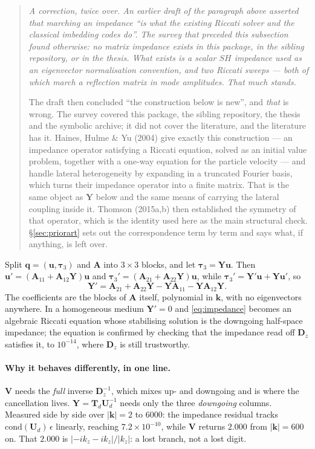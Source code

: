 \documentclass[11pt,a4paper]{article}
\newcommand{\bA}{\mathbf{A}}
\newcommand{\bV}{\mathbf{V}}
\newcommand{\bq}{\mathbf{q}}
\newcommand{\bu}{\mathbf{u}}
\newcommand{\bta}{\boldsymbol{\tau}}
\newcommand{\bY}{\mathbf{Y}}
\begin{document}
\begin{quote}
\small\itshape
A correction, twice over.  An earlier draft of the paragraph above asserted that
marching an impedance ``is what the existing Riccati solver and the classical
imbedding codes do''.  The survey that preceded this subsection found otherwise:
no matrix impedance exists in this package, in the sibling repository, or in the
thesis.  What exists is a \emph{scalar} $SH$ impedance used as an eigenvector
normalisation convention, and two Riccati sweeps --- both of which march a
reflection matrix in \emph{mode amplitudes}.  That much stands.

The draft then concluded ``the construction below is new'', and \emph{that} is
wrong.  The survey covered this package, the sibling repository, the thesis and
the symbolic archive; it did not cover the literature, and the literature has
it.  Haines, Hulme \& Yu (2004) give exactly this construction --- an impedance
operator satisfying a Riccati equation, solved as an initial value problem,
together with a one-way equation for the particle velocity --- and handle
lateral heterogeneity by expanding in a truncated Fourier basis, which turns
their impedance operator into a finite matrix.  That is the same object as
$\bY$ below and the same means of carrying the lateral coupling inside it.
Thomson (2015a,b) then established the symmetry of that operator, which is the
identity used here as the main structural check.  \S\ref{sec:priorart} sets out
the correspondence term by term and says what, if anything, is left over.
\end{quote}

Split $\bq = (\bu,\bta_3)$ and $\bA$ into $3\times3$ blocks, and let
$\bta_3 = \bY\bu$.  Then $\bu' = (\bA_{11}+\bA_{12}\bY)\bu$ and
$\bta_3' = (\bA_{21}+\bA_{22}\bY)\bu$, while $\bta_3' = \bY'\bu + \bY\bu'$, so
\begin{equation}\label{eq:impedance}
  \bY' = \bA_{21} + \bA_{22}\bY - \bY\bA_{11} - \bY\bA_{12}\bY .
\end{equation}
The coefficients are the blocks of $\bA$ itself, polynomial in $\mathbf{k}$,
with no eigenvectors anywhere.  In a homogeneous medium $\bY'=0$ and
\eqref{eq:impedance} becomes an algebraic Riccati equation whose stabilising
solution is the downgoing half-space impedance; the equation is confirmed by
checking that the impedance read off $\mathbf{D}_z$ satisfies it, to
$10^{-14}$, where $\mathbf{D}_z$ is still trustworthy.

\paragraph{Why it behaves differently, in one line.}  $\bV$ needs the
\emph{full} inverse $\mathbf{D}_z^{-1}$, which mixes up- and downgoing and is
where the cancellation lives.  $\bY = \mathbf{T}_d\mathbf{U}_d^{-1}$ needs only
the three \emph{downgoing} columns.  Measured side by side over
$|\mathbf{k}| = 2$ to $6000$: the impedance residual tracks
$\mathrm{cond}(\mathbf{U}_d)\,\epsilon$ linearly, reaching
$7.2\times10^{-10}$, while $\bV$ returns $2.000$ from
$|\mathbf{k}| = 600$ on.  That $2.000$ is $|{-}ik_z - ik_z|/|k_z|$: a lost
branch, not a lost digit.
\end{document}
